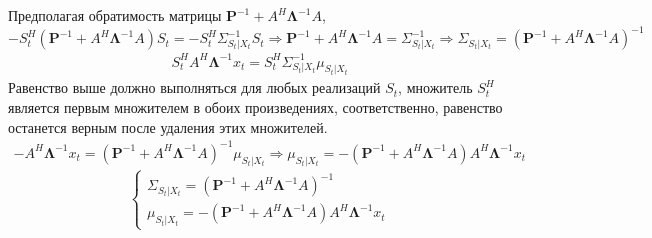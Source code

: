 \documentclass[11pt]{article}
\begin{document}
Предполагая обратимость матрицы $\mathbf{P}^{-1}+ A^H \mathbf{\Lambda}^{-1} A$,
\begin{equation*}
-S_t^H(\mathbf{P}^{-1}+A^H \mathbf{\Lambda}^{-1} A)S_t = -S_t^H \Sigma_{S_t|X_t}^{-1}S_t  \Rightarrow \mathbf{P}^{-1}+ A^H \mathbf{\Lambda}^{-1} A= \Sigma_{S_t|X_t}^{-1} \Rightarrow \Sigma_{S_t|X_t} = (\mathbf{P}^{-1}+ A^H \mathbf{\Lambda}^{-1} A)^{-1}
\end{equation*}
\begin{gather*}
S_t^H A^H\mathbf{\Lambda}^{-1}x_t = S_t^H \Sigma_{S_t|X_t}^{-1}\mu_{S_t|X_t}
\end{gather*}
Равенство выше должно выполняться для любых реализаций $S_t$, множитель $S_t^H$ является первым множителем в обоих произведениях, соответственно, равенство останется верным после удаления этих множителей.
\begin{gather*}
-A^H\mathbf{\Lambda}^{-1}x_t = (\mathbf{P}^{-1}+ A^H \mathbf{\Lambda}^{-1} A)^{-1} \mu_{S_t|X_t} \Rightarrow \mu_{S_t|X_t} =- (\mathbf{P}^{-1}+ A^H \mathbf{\Lambda}^{-1} A) A^H\mathbf{\Lambda}^{-1}x_t
\end{gather*}
\begin{equation}
\left\{ \begin{gathered} 
\Sigma_{S_t|X_t} = (\mathbf{P}^{-1}+ A^H \mathbf{\Lambda}^{-1} A)^{-1} \\
\mu_{S_t|X_t} =- (\mathbf{P}^{-1}+ A^H \mathbf{\Lambda}^{-1} A) A^H\mathbf{\Lambda}^{-1}x_t
\end{gathered} \right.
\end{equation}
\end{document}
